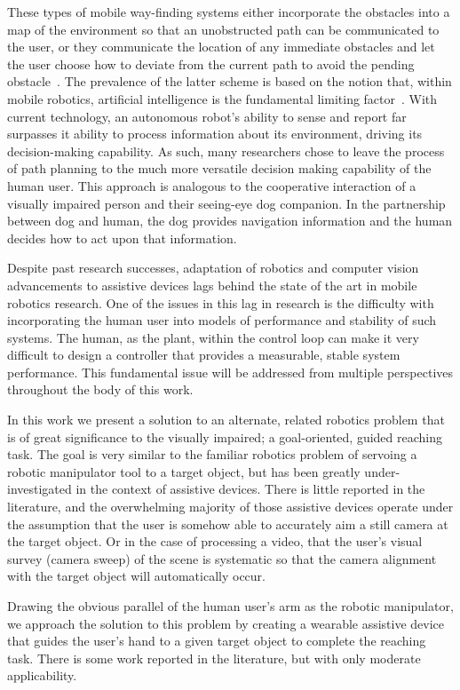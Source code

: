 These types of mobile way-finding systems either incorporate the obstacles into a map of the environment so that an unobstructed path can be communicated to the user, or they communicate the location of any immediate obstacles and let the user choose how to deviate from the current path to avoid the pending obstacle~\cite{Bib:Ram, Bib:Meers}. The prevalence of the latter scheme is based on the notion that, within mobile robotics, artificial intelligence is the fundamental limiting factor~\cite{Bib:Parker}.  With current technology, an autonomous robot's ability to sense and report far surpasses it ability to process information about its environment, driving its decision-making capability.  As such, many researchers chose to leave the process of path planning to the much more versatile decision making capability of the human user.  This approach is analogous to the cooperative interaction of a visually impaired person and their seeing-eye dog companion.  In the partnership between dog and human, the dog provides navigation information and the human decides how to act upon that information.

Despite past research successes, adaptation of robotics and computer vision advancements to assistive devices lags behind the state of the art in mobile robotics research.  One of the issues in this lag in research is the difficulty with incorporating the human user into models of performance and stability of such systems.  The human, as the plant, within the control loop can make it very difficult to design a controller that provides a measurable, stable system performance.  This fundamental issue will be addressed from multiple perspectives throughout the body of this work.

In this work we present a solution to an alternate, related robotics problem that is of great significance to the visually impaired; a goal-oriented, guided reaching task.  The goal is very similar to the familiar robotics problem of servoing a robotic manipulator tool to a target object, but has been greatly under-investigated in the context of assistive devices.  There is little reported in the literature, and the overwhelming majority of those assistive devices operate under the assumption that the user is somehow able to accurately aim a still camera at the target object.  Or in the case of processing a video, that the user's visual survey (camera sweep) of the scene is systematic so that the camera alignment with the target object will automatically occur.

Drawing the obvious parallel of the human user's arm as the robotic manipulator, we approach the solution to this problem by creating a wearable assistive device that guides the user's hand to a given target object to complete the reaching task.  There is some work reported in the literature, but with only moderate applicability.

